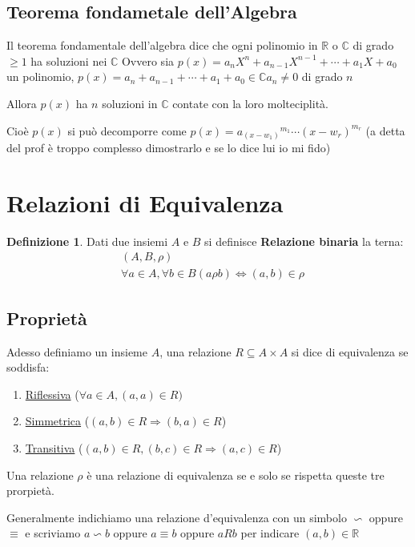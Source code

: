 \documentclass{article}
\theoremstyle{definition}
\newtheorem{definition}{Definizione}[section]
\begin{document}
\subsection{Teorema fondametale dell'Algebra}\label{sec:teorema_fondamentale_dell_algebra}
Il teorema fondamentale dell'algebra dice che ogni polinomio in $\mathbb{R}$ o $\mathbb{C}$ di grado $\geq 1$ ha soluzioni nei $\mathbb{C}$ \newline 
Ovvero sia $p(x) = a_n X^n + a_{n-1} X^{n-1} + \cdots + a_1 X + a_0$ un polinomio, $p(x) = a_n  + a_{n-1} + \cdots + a_1 + a_0 \in \mathbb{C} a_n \not = 0$ di grado $n$ \par
Allora $p(x)$ ha $n$ soluzioni in $\mathbb{C}$ contate con la loro molteciplità.\par
Cioè $p(x)$ si può decomporre come $p(x) = {a_(x-w_1)}^{m_1} \cdots {(x-w_r)}^{m_r}$ \newline
(a detta del prof è troppo complesso dimostrarlo e se lo dice lui io mi fido)







\newpage
\section{Relazioni di Equivalenza}\label{sec:relazioni_di_equivalenza}
\begin{definition}
Dati due insiemi $ A $ e $ B $ si definisce \textbf{Relazione binaria} la terna:
\begin{align*}
        & (A, B, \rho) \\
        & \forall a \in A, \forall b \in B (a \rho b) \Leftrightarrow (a, b) \in \rho
\end{align*}
\end{definition}



\subsection{Proprietà}
Adesso definiamo un insieme $A$, una relazione $R \subseteq A \times A$ si dice di equivalenza se soddisfa:

\begin{tcolorbox}
        
\begin{enumerate}
        \item \underline{Riflessiva} ($\forall a \in A, (a,a) \in R)$
        \item \underline{Simmetrica} ($(a,b) \in R \Rightarrow (b,a) \in R$)
        \item \underline{Transitiva} ($(a,b) \in R, (b,c) \in R \Rightarrow (a,c) \in R$)
\end{enumerate}
Una relazione $ \rho $ è una relazione di equivalenza se e solo se rispetta queste tre prorpietà. \newline
\end{tcolorbox}
Generalmente indichiamo una relazione d'equivalenza con un simbolo  $\backsim$ oppure $\equiv$ e scriviamo $a \backsim b$ oppure $a \equiv b$ oppure $aRb$ per indicare $(a,b) \in \mathbb{R}$
\end{document}
